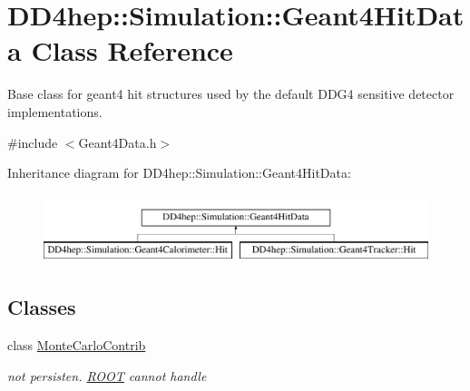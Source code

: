 \hypertarget{class_d_d4hep_1_1_simulation_1_1_geant4_hit_data}{}\section{D\+D4hep\+:\+:Simulation\+:\+:Geant4\+Hit\+Data Class Reference}
\label{class_d_d4hep_1_1_simulation_1_1_geant4_hit_data}


Base class for geant4 hit structures used by the default D\+D\+G4 sensitive detector implementations.  




{\ttfamily \#include $<$Geant4\+Data.\+h$>$}

Inheritance diagram for D\+D4hep\+:\+:Simulation\+:\+:Geant4\+Hit\+Data\+:\begin{figure}[H]
\begin{center}
\leavevmode
\includegraphics[height=2.000000cm]{class_d_d4hep_1_1_simulation_1_1_geant4_hit_data}
\end{center}
\end{figure}
\subsection*{Classes}
\begin{DoxyCompactItemize}
\item 
class \hyperlink{class_d_d4hep_1_1_simulation_1_1_geant4_hit_data_1_1_monte_carlo_contrib}{Monte\+Carlo\+Contrib}
\begin{DoxyCompactList}\small\item\em not persisten. \hyperlink{namespace_r_o_o_t}{R\+O\+OT} cannot handle \end{DoxyCompactList}\end{DoxyCompactItemize}
